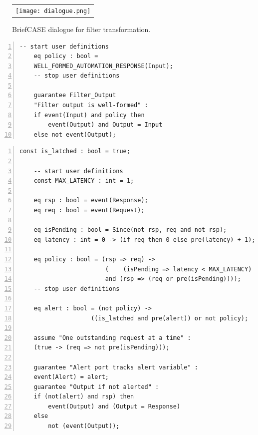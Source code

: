 \begin{figure}
  \begin{center}
    \begin{tabular}{c}
    \texttt{[image: dialogue.png]}
    \end{tabular}
  \end{center}
  \caption{BriefCASE dialogue for filter transformation.}
  \label{fig:dialogue}
\end{figure}

\newsavebox{\flt}
\begin{lrbox}{\flt}
  \begin{lstlisting}[style=agree,numbers=left]
    -- start user definitions
    eq policy : bool = 
    WELL_FORMED_AUTOMATION_RESPONSE(Input);
    -- stop user definitions

    guarantee Filter_Output
    "Filter output is well-formed" :
    if event(Input) and policy then 
        event(Output) and Output = Input
    else not event(Output);
  \end{lstlisting}
\end{lrbox}

\newsavebox{\mntr}
\begin{lrbox}{\mntr}
  \begin{lstlisting}[style=agree,numbers=left]
    const is_latched : bool = true;

    -- start user definitions
    const MAX_LATENCY : int = 1;
        
    eq rsp : bool = event(Response);
    eq req : bool = event(Request);

    eq isPending : bool = Since(not rsp, req and not rsp);
    eq latency : int = 0 -> (if req then 0 else pre(latency) + 1);
    
    eq policy : bool = (rsp => req) ->
                        (    (isPending => latency < MAX_LATENCY)   
                        and (rsp => (req or pre(isPending))));
    -- stop user definitions
    
    eq alert : bool = (not policy) -> 
                    ((is_latched and pre(alert)) or not policy);

    assume "One outstanding request at a time" :
    (true -> (req => not pre(isPending))); 
                            
    guarantee "Alert port tracks alert variable" :
    event(Alert) = alert;
    guarantee "Output if not alerted" :
    if (not(alert) and rsp) then
        event(Output) and (Output = Response)
    else
        not (event(Output));    
  \end{lstlisting}
\end{lrbox}

